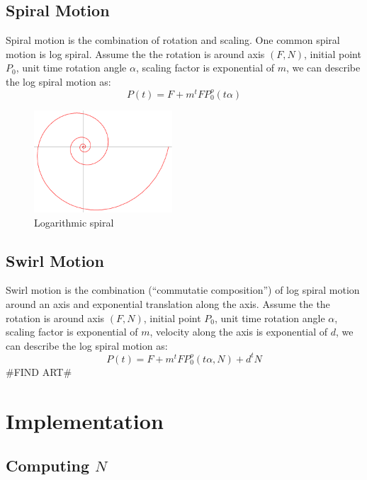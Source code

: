 \documentclass[twoside,11pt]{article}
\begin{document}
\subsection{Spiral Motion}
Spiral motion is the combination of rotation and scaling. One common spiral motion is log spiral. Assume the the rotation is around axis $(F, N)$, initial point $P_0$, unit time rotation angle $\alpha$, scaling factor is exponential of $m$, we can describe the log spiral motion as:
\begin{equation}
P(t) = F + m^t FP_0^o(t\alpha)
\end{equation}

\begin{figure}[h!]
  \centering
  \includegraphics[width=0.46\textwidth]{log_spiral}
  \caption{Logarithmic spiral}

\end{figure}

\subsection{Swirl Motion}
Swirl motion is the combination (``commutatie composition'') of log spiral motion around an axis and exponential translation along the axis. Assume the the rotation is around axis $(F, N)$, initial point $P_0$, unit time rotation angle $\alpha$, scaling factor is exponential of $m$, velocity along the axis is exponential of $d$, we can describe the log spiral motion as:
\begin{equation}
P(t) = F + m^t FP_0^o(t\alpha, N) + d^t N
\end{equation}
\#FIND ART\#

\section{Implementation}


\subsection{Computing $N$}
\end{document}
